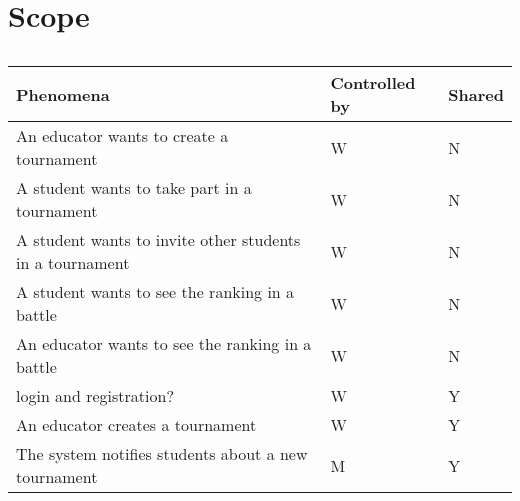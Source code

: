 \section{Scope}
\begin{center} %
    \begin{longtable}{|p{8.7cm}|p{3cm}|p{3cm}|}
        \caption[Phenomena Table]{}
        \label{table:phenomena}
        \endlastfoot
        \hline
        \rowcolor{gray!50}
        \textbf{Phenomena}                                                                                                                    & \textbf{Controlled by} & \textbf{Shared} \\ \hline
        An educator wants to create a tournament                                                                                              & W                      & N               \\ \hline
        A student wants to take part in a tournament                                                                                          & W                      & N               \\ \hline
        A student wants to invite other students in a tournament                                                                              & W                      & N               \\ \hline
        A student wants to see the ranking in a battle                                                                                        & W                      & N               \\ \hline
        An educator wants to see the ranking in a battle                                                                                      & W                      & N               \\ \hline
        login and registration?                                                                                                               & W                      & Y               \\ \hline
        An educator creates a tournament                                                                                                      & W                      & Y               \\ \hline
        The system notifies students about a new tournament                                                                                   & M                      & Y               \\ \hline

\end{longtable}
\end{center}
